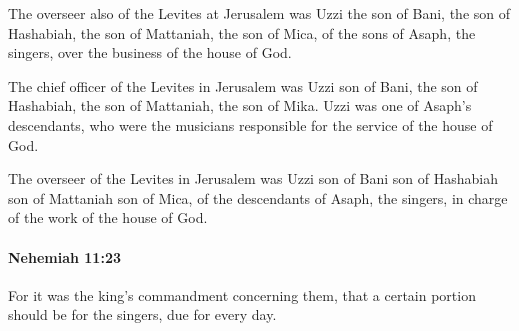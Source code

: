 			\begin{versebox}
					\item[BHS] 
					\item[LXX] 
					\item[ASV] The overseer also of the Levites at Jerusalem was Uzzi the son of Bani, the son of Hashabiah, the son of Mattaniah, the son of Mica, of the sons of Asaph, the singers, over the business of the house of God.
					\item[NIV] The chief officer of the Levites in Jerusalem was Uzzi son of Bani, the son of Hashabiah, the son of Mattaniah, the son of Mika. Uzzi was one of Asaph’s descendants, who were the musicians responsible for the service of the house of God.
					\item[NRSV] The overseer of the Levites in Jerusalem was Uzzi son of Bani son of Hashabiah son of Mattaniah son of Mica, of the descendants of Asaph, the singers, in charge of the work of the house of God.
			\end{versebox}

		\paragraph{Nehemiah 11:23} %
			\label{NEHEMIAH-11-23}

			For it was the king’s commandment concerning them, that a certain portion should be for the singers, due for every day.

